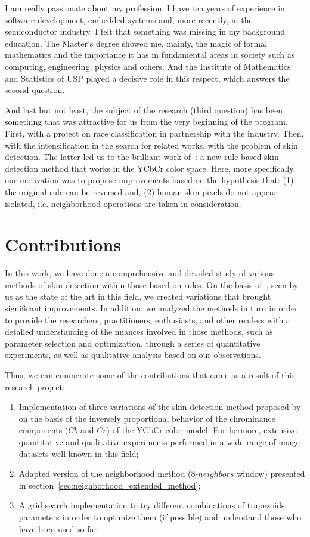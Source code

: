 I am really passionate about my profession. I have ten years of experience in software development, embedded systems and, more recently, in the semiconductor industry. I felt that something was missing in my background education. The Master's degree showed me, mainly, the magic of formal mathematics and the importance it has in fundamental areas in society such as computing, engineering, physics and others. And the Institute of Mathematics and Statistics of USP played a decisive role in this respect, which answers the second question.

And last but not least, the subject of the research (third question) has been something that was attractive for us from the very beginning of the program. First, with a project on race classification in partnership with the industry. Then, with the intensification in the search for related works, with the problem of skin detection. The latter led us to the brilliant work of~\citet{brancati:17}: a new rule-based skin detection method that works in the YCbCr color space. Here, more specifically, our motivation was to propose improvements based on the hypothesis that: (1) the original rule can be reversed and, (2) human skin pixels do not appear isolated, i.e. neighborhood operations are taken in consideration.


\section{Contributions}
\label{sec:contributions}

In this work, we have done a comprehensive and detailed study of various methods of skin detection within those based on rules. On the basis of~\citet{brancati:17}, seen by us as the state of the art in this field, we created variations that brought significant improvements. In addition, we analyzed the methods in turn in order to provide the researchers, practitioners, enthusiasts, and other readers with a detailed understanding of the nuances involved in those methods, such as parameter selection and optimization, through a series of quantitative experiments, as well as qualitative analysis based on our observations.

Thus, we can enumerate some of the contributions that came as a result of this research project:
\begin{enumerate}
    \item Implementation of three variations of the skin detection method proposed by~\citet{brancati:17} on the basis of the inversely proportional behavior of the chrominance components ($Cb$ and $Cr$) of the YCbCr color model. Furthermore, extensive quantitative and qualitative experiments performed in a wide range of image datasets well-known in this field;
    \item Adapted version of the neighborhood method (8-$neighbors$ window) presented in section~\ref{sec:neighborhood_extended_method};
    \item A grid search implementation to try different combinations of trapezoids parameters in order to optimize them (if possible) and understand those who have been used so far.
\end{enumerate}

